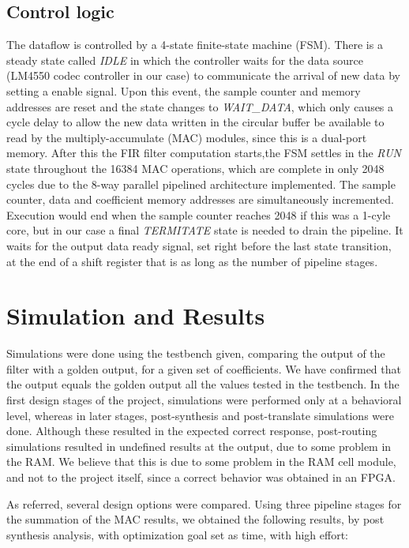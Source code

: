 \documentclass[12pt]{article}
\begin{document}
\subsection{Control logic}
The dataflow is controlled by a 4-state finite-state machine (FSM). There is a steady state called
\emph{IDLE} in which the controller waits for the data source (LM4550 codec controller in our case)
to  communicate the arrival of new data by setting a enable signal. Upon this event, the sample
counter and memory addresses are reset and the state changes to \emph{WAIT\_DATA}, which only causes
a cycle delay to allow the new data written in the circular buffer be available to read by the
multiply-accumulate (MAC) modules, since this is a dual-port memory. After this the FIR filter
computation starts,the FSM settles in the \emph{RUN} state throughout the 16384 MAC operations,
which are complete in only 2048 cycles due to the 8-way parallel pipelined architecture implemented.
The sample counter, data and coefficient memory addresses are simultaneously incremented. Execution
would end when the sample counter reaches 2048 if this was a 1-cyle core, but in our case a final
\emph{TERMITATE} state is needed to drain the pipeline. It waits for the output data ready signal,
set right before the last state transition, at the end of a shift register that is as long as the
number of pipeline stages.

\section{Simulation and Results}
Simulations were done using the testbench given, comparing the output of the filter with a golden
output, for a given set of coefficients. We have confirmed that the output equals the golden output
all the values tested in the testbench. In the first design stages of the project, simulations were
performed only at a behavioral level, whereas in later stages, post-synthesis and post-translate
simulations were done. Although these resulted in the expected correct response, post-routing
simulations resulted in undefined results at the output, due to some problem in the RAM. We believe
that this is due to some problem in the RAM cell module, and not to the project itself, since a
correct behavior was obtained in an FPGA.

As referred, several design options were compared. Using three pipeline stages for the summation of
the MAC results, we obtained the following results, by post synthesis analysis, with optimization
goal set as time, with high effort:
\end{document}
